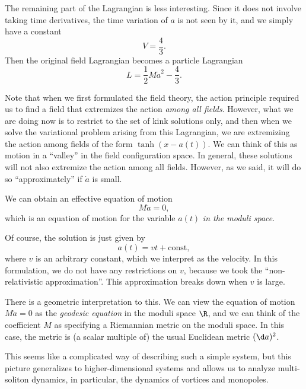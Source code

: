 \documentclass[a4paper]{article}
\begin{document}
The remaining part of the Lagrangian is less interesting. Since it does not involve taking time derivatives, the time variation of $a$ is not seen by it, and we simply have a constant
\[
  V = \frac{4}{3}.
\]
Then the original field Lagrangian becomes a particle Lagrangian
\[
  L = \frac{1}{2}M \dot{a}^2 - \frac{4}{3}.
\]

Note that when we first formulated the field theory, the action principle required us to find a field that extremizes the action \emph{among all fields}. However, what we are doing now is to restrict to the set of kink solutions only, and then when we solve the variational problem arising from this Lagrangian, we are extremizing the action among fields of the form $\tanh (x - a(t))$. We can think of this as motion in a ``valley'' in the field configuration space. In general, these solutions will not also extremize the action among all fields. However, as we said, it will do so ``approximately'' if $\dot{a}$ is small.

We can obtain an effective equation of motion
\[
  M \ddot{a} = 0,
\]
which is an equation of motion for the variable $a(t)$ \emph{in the moduli space}.

Of course, the solution is just given by
\[
  a(t) = vt + \mathrm{const},
\]
where $v$ is an arbitrary constant, which we interpret as the velocity. In this formulation, we do not have any restrictions on $v$, because we took the ``non-relativistic approximation''. This approximation breaks down when $v$ is large.

There is a geometric interpretation to this. We can view the equation of motion $M\ddot{a} = 0$ as the \emph{geodesic equation} in the moduli space $\R$, and we can think of the coefficient $M$ as specifying a Riemannian metric on the moduli space. In this case, the metric is (a scalar multiple of) the usual Euclidean metric $(\d a)^2$.

This seems like a complicated way of describing such a simple system, but this picture generalizes to higher-dimensional systems and allows us to analyze multi-soliton dynamics, in particular, the dynamics of vortices and monopoles.
\end{document}
